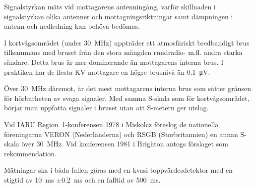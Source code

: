 \newpage

Signalstyrkan mäts vid mottagarens antenningång, varför skillnaden i
signalstyrkan olika antenner och mottagningsriktningar samt dämpningen
i antenn och nedledning kan behöva bedömas.

I kortvågsområdet (under \SI{30}{\mega\hertz}) uppträder ett atmosfäriskt
bredbandigt brus tillsammans med bruset från den stora mängden rundradio- m.fl.
andra starka sändare.
Detta brus är mer dominerande än mottagarens interna brus.
I praktiken har de flesta KV-mottagare en högre brusnivå än
\SI{0,1}{\micro\volt}.

Över \SI{30}{\mega\hertz} däremot, är det mest mottagarens interna brus som
sätter gränsen för hörbarheten av svaga signaler.
Med samma S-skala som för kortvågsområdet, börjar man uppfatta signaler i
bruset utan att S-metern ger utslag.

Vid IARU Region~1-konferensen 1978 i Miskolcz föreslog de nationella
föreningarna VERON (Nederländerna) och RSGB (Storbritannien) en annan
S-skala över \SI{30}{\mega\hertz}.
Vid konferensen 1981 i Brighton antogs förslaget som rekommendation.

Mätningar ska i båda fallen göras med en kvasi-toppvärdesdetektor med en stigtid
av \SI{10}{\milli\second} \(\pm\)\SI{0,2}{\milli\second} och en falltid av
\SI{500}{\milli\second}.
